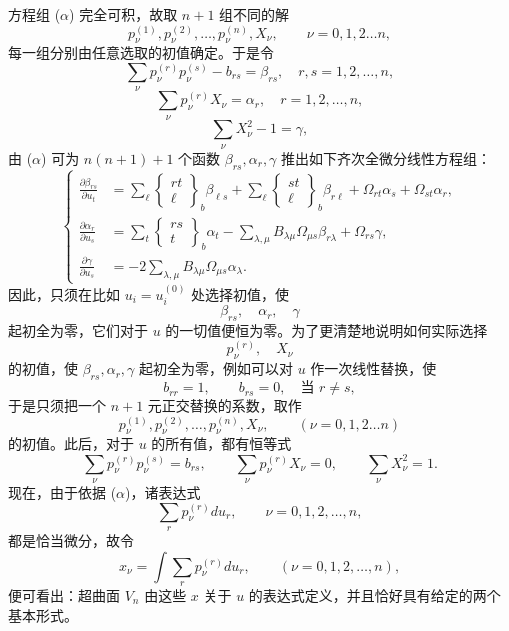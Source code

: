 方程组 (\(\alpha\)) 完全可积，故取 $n+1$ 组不同的解
\[
p_\nu^{(1)},p_\nu^{(2)},\ldots,p_\nu^{(n)},X_\nu,\qquad \nu=0,1,2\ldots n,
\]
每一组分别由任意选取的初值确定。于是令
\[
\sum_\nu p_\nu^{(r)}p_\nu^{(s)}-b_{rs}=\beta_{rs},\quad r,s=1,2,\ldots,n,
\]
\[
\sum_\nu p_\nu^{(r)}X_\nu=\alpha_r,\quad r=1,2,\ldots,n,
\]
\[
\sum_\nu X_\nu^2-1=\gamma,
\]
由 (\(\alpha\)) 可为 $n(n+1)+1$ 个函数 $\beta_{rs},\alpha_r,\gamma$ 推出如下齐次全微分线性方程组：
\[
\left\{
\begin{aligned}
\frac{\partial\beta_{rs}}{\partial u_t}
&=\sum_\ell\left\{\begin{matrix}rt\\ \ell\end{matrix}\right\}_b\beta_{\ell s}
+\sum_\ell\left\{\begin{matrix}st\\ \ell\end{matrix}\right\}_b\beta_{r\ell}
+\Omega_{rt}\alpha_s+\Omega_{st}\alpha_r,\\
\frac{\partial\alpha_r}{\partial u_s}
&=\sum_t\left\{\begin{matrix}rs\\ t\end{matrix}\right\}_b\alpha_t
-\sum_{\lambda,\mu}B_{\lambda\mu}\Omega_{\mu s}\beta_{r\lambda}
+\Omega_{rs}\gamma,\\
\frac{\partial\gamma}{\partial u_s}
&=-2\sum_{\lambda,\mu}B_{\lambda\mu}\Omega_{\mu s}\alpha_\lambda.
\end{aligned}\right.
\]
因此，只须在比如 $u_i=u_i^{(0)}$ 处选择初值，使
\[
\beta_{rs},\quad \alpha_r,\quad \gamma
\]
起初全为零，它们对于 $u$ 的一切值便恒为零。为了更清楚地说明如何实际选择
\[
p_\nu^{(r)},\quad X_\nu
\]
的初值，使 $\beta_{rs},\alpha_r,\gamma$ 起初全为零，例如可以对 $u$ 作一次线性替换，使
\[
b_{rr}=1,\qquad b_{rs}=0,\quad \text{当 }r\ne s,
\]
于是只须把一个 $n+1$ 元正交替换的系数，取作
\[
p_\nu^{(1)},p_\nu^{(2)},\ldots,p_\nu^{(n)},X_\nu,\qquad (\nu=0,1,2\ldots n)
\]
的初值。此后，对于 $u$ 的所有值，都有恒等式
\[
\sum_\nu p_\nu^{(r)}p_\nu^{(s)}=b_{rs},\qquad
\sum_\nu p_\nu^{(r)}X_\nu=0,\qquad
\sum_\nu X_\nu^2=1.
\]
现在，由于依据 (\(\alpha\))，诸表达式
\[
\sum_r p_\nu^{(r)}du_r,\qquad \nu=0,1,2,\ldots,n,
\]
都是恰当微分，故令
\[
\tag{1}
x_\nu=\int\sum_r p_\nu^{(r)}du_r,\qquad (\nu=0,1,2,\ldots,n),
\]
便可看出：超曲面 $V_n$ 由这些 $x$ 关于 $u$ 的表达式定义，并且恰好具有给定的两个基本形式。

